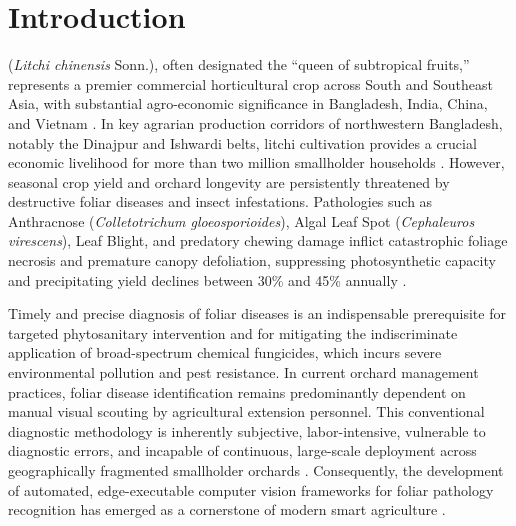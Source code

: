 \section{Introduction}
\label{sec:intro}
 (\textit{Litchi chinensis} Sonn.), often designated the ``queen of subtropical fruits,'' represents a premier commercial horticultural crop across South and Southeast Asia, with substantial agro-economic significance in Bangladesh, India, China, and Vietnam \cite{litchi_dataset_2022}. In key agrarian production corridors of northwestern Bangladesh, notably the Dinajpur and Ishwardi belts, litchi cultivation provides a crucial economic livelihood for more than two million smallholder households \cite{islam2021survey}. However, seasonal crop yield and orchard longevity are persistently threatened by destructive foliar diseases and insect infestations. Pathologies such as Anthracnose (\textit{Colletotrichum gloeosporioides}), Algal Leaf Spot (\textit{Cephaleuros virescens}), Leaf Blight, and predatory chewing damage inflict catastrophic foliage necrosis and premature canopy defoliation, suppressing photosynthetic capacity and precipitating yield declines between 30\% and 45\% annually \cite{islam2021survey}.

Timely and precise diagnosis of foliar diseases is an indispensable prerequisite for targeted phytosanitary intervention and for mitigating the indiscriminate application of broad-spectrum chemical fungicides, which incurs severe environmental pollution and pest resistance. In current orchard management practices, foliar disease identification remains predominantly dependent on manual visual scouting by agricultural extension personnel. This conventional diagnostic methodology is inherently subjective, labor-intensive, vulnerable to diagnostic errors, and incapable of continuous, large-scale deployment across geographically fragmented smallholder orchards \cite{barbedo2019plant}. Consequently, the development of automated, edge-executable computer vision frameworks for foliar pathology recognition has emerged as a cornerstone of modern smart agriculture \cite{mohanty2016using, ferentinos2018deep, fuentes2017robust}.

